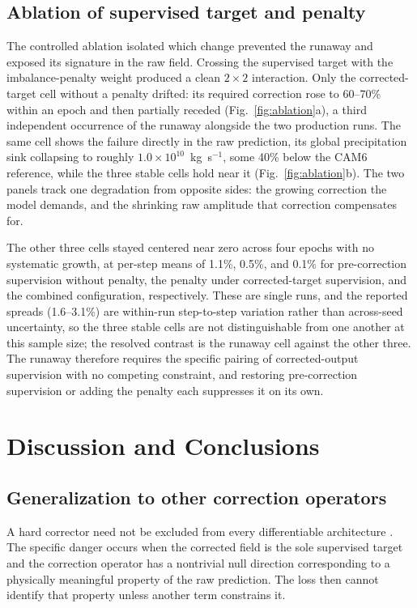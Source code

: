 \documentclass{ametsocV6.1}
\begin{document}
\subsection{Ablation of supervised target and penalty}\label{sec:ablation}

The controlled ablation isolated which change prevented the runaway and exposed its signature in the raw field. Crossing the supervised target with the imbalance-penalty weight produced a clean $2\times2$ interaction. Only the corrected-target cell without a penalty drifted: its required correction rose to 60--70\% within an epoch and then partially receded (Fig.~\ref{fig:ablation}a), a third independent occurrence of the runaway alongside the two production runs. The same cell shows the failure directly in the raw prediction, its global precipitation sink collapsing to roughly $1.0\times10^{10}$~kg~s$^{-1}$, some 40\% below the CAM6 reference, while the three stable cells hold near it (Fig.~\ref{fig:ablation}b). The two panels track one degradation from opposite sides: the growing correction the model demands, and the shrinking raw amplitude that correction compensates for.

The other three cells stayed centered near zero across four epochs with no systematic growth, at per-step means of 1.1\%, 0.5\%, and 0.1\% for pre-correction supervision without penalty, the penalty under corrected-target supervision, and the combined configuration, respectively. These are single runs, and the reported spreads (1.6--3.1\%) are within-run step-to-step variation rather than across-seed uncertainty, so the three stable cells are not distinguishable from one another at this sample size; the resolved contrast is the runaway cell against the other three. The runaway therefore requires the specific pairing of corrected-output supervision with no competing constraint, and restoring pre-correction supervision or adding the penalty each suppresses it on its own.

\section{Discussion and Conclusions}\label{sec:discussion}

\subsection{Generalization to other correction operators}\label{sec:lesson}

A hard corrector need not be excluded from every differentiable architecture \citep{beucler2021,zanetta2023,valente2025,harder2023hardconstrained}. The specific danger occurs when the corrected field is the sole supervised target and the correction operator has a nontrivial null direction corresponding to a physically meaningful property of the raw prediction. The loss then cannot identify that property unless another term constrains it.
\end{document}
